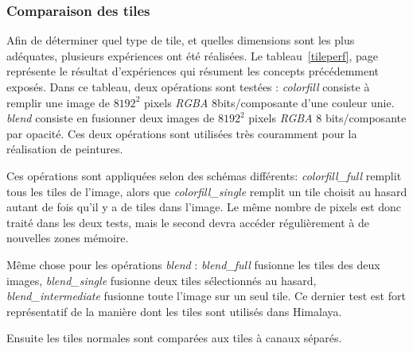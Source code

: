 		\subsubsection{Comparaison des tiles}
			Afin de déterminer quel type de tile, et quelles dimensions sont les plus adéquates, plusieurs expériences ont été réalisées.
			Le tableau~\ref{tileperf}, page~\pageref{tileperf} repré\-sente le résultat d'expériences qui résument les concepts précédemment exposés. Dans ce tableau, deux opérations
			sont testées : \emph{colorfill} consiste à remplir une image de $8192^2$ pixels \emph{RGBA} 8bits/composante d'une couleur unie. \emph{blend} consiste 
			en fusionner deux images de $8192^2$ pixels \emph{RGBA} 8 bits/composante par opacité. Ces deux opérations 
			sont utilisées très couramment pour la réalisation de peintures. 

			Ces opérations sont appliquées selon des schémas différents: \emph{colorfill\_full} remplit tous les tiles de l'image, alors que \emph{colorfill\_single}
			remplit un tile choisit au hasard autant de fois qu'il y a de tiles dans l'image. Le même nombre de pixels est donc traité dans les deux tests,
			mais le second devra accéder régulièrement à de nouvelles zones mémoire.

			Même chose pour les opérations \emph{blend} : \emph{blend\_full} fusionne les tiles des deux images, \emph{blend\_single} fusionne deux tiles
			sélectionnés au hasard, \emph{blend\_intermediate} fusionne toute l'image sur un seul tile. Ce dernier test est fort représentatif de la
			manière dont les tiles sont utilisés dans Himalaya.

			Ensuite les tiles normales sont comparées aux tiles à canaux séparés. 
			

